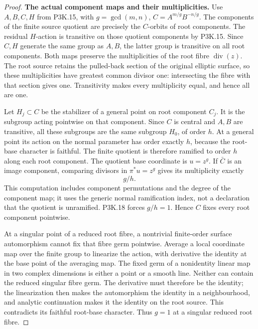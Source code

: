 \begin{proof}
\par\medskip\noindent\textbf{The actual component maps and their multiplicities.}\enspace
Use \(A,B,C,H\) from P3K.15, with
\(g=\gcd(m,n)\), \(C=A^{m/g}B^{-n/g}\).
The components of the finite source quotient are precisely
the \(C\)-orbits of root components.  The residual
\(H\)-action is transitive on those quotient components
by P3K.15.  Since \(C,H\) generate the same group as
\(A,B\), the latter group is transitive on all root
components.  Both maps preserve the multiplicities of
the root fibre \(\operatorname{div}(z)\).  The root
source retains the pulled-back section of the original
elliptic surface, so these multiplicities have greatest
common divisor one: intersecting the fibre with that
section gives one.  Transitivity makes every multiplicity
equal, and hence all are one.

Let \(H_j\subset C\) be the stabilizer of a general
point on root component \(C_j\).  It is the subgroup
acting pointwise on that component.  Since \(C\) is
central and \(A,B\) are transitive, all these subgroups
are the same subgroup \(H_0\), of order \(h\).
At a general point its action on the normal parameter has
order exactly \(h\), because the root-base character is
faithful.  The finite quotient is therefore ramified to
order \(h\) along each root component.  The quotient
base coordinate is \(u=z^g\).  If \(\bar C\) is an
image component, comparing divisors in
\(\pi^*u=z^g\) gives its multiplicity exactly
\[
                              g/h.                         \tag{P3K.19.2}
\]
This computation includes component permutations and the
degree of the component map; it uses the generic normal
ramification index, not a declaration that the quotient is
unramified.  P3K.18 forces \(g/h=1\).  Hence \(C\)
fixes every root component pointwise.

At a singular point of a reduced root fibre, a nontrivial
finite-order surface automorphism cannot fix that fibre
germ pointwise.  Average a local coordinate map over the
finite group to linearize the action, with derivative the
identity at the base point of the averaging map.  The fixed
germ of a nonidentity linear map in two complex dimensions
is either a point or a smooth line.  Neither can contain
the reduced singular fibre germ.  The derivative must
therefore be the identity; the linearization then makes
the automorphism the identity in a neighbourhood, and
analytic continuation makes it the identity on the root
source.  This contradicts its faithful root-base character.
Thus \(g=1\) at a singular reduced root fibre.


\end{proof}
